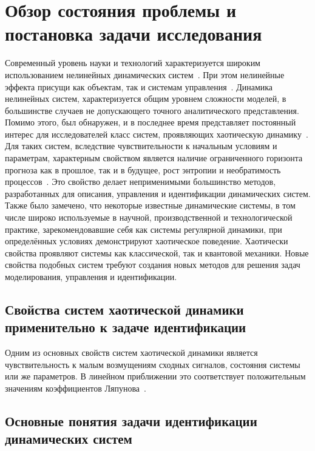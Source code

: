 \chapter{Обзор состояния проблемы и постановка задачи исследования}

Современный уровень науки и технологий характеризуется
широким использованием нелинейных динамических
систем~\cite{andronov_vitt_haikin,anisch_nonlin_eff,mishenko_du_small_relax,nonlin_vibro}.
При этом нелинейные эффекта присущи как объектам,
так и системам управления~\cite{kubik_nlsc,vukobr_nonadopt}. Динамика нелинейных систем,
характеризуется общим уровнем сложности моделей,
в большинстве случаев не допускающего
точного аналитического представления.
Помимо этого, был обнаружен, и в последнее время представляет
постоянный интерес для исследователей класс систем,
проявляющих хаотическую динамику~\cite{moon_chaotic_vibr,magni_theory_dyn_chaos,kuznetsov_dyn_chaos,neimark_stoch_chaos_vibro}.
Для таких систем, вследствие чувствительности к начальным условиям
и параметрам, характерным свойством является наличие ограниченного горизонта прогноза как
в прошлое, так и в будущее, рост энтропии
и необратимость процессов~\cite{chernavskii_syn_info,prigogine_from_existent,koltsova_nl_dyn_chem}.
Это свойство делает неприменимыми
большинство методов, разработанных для описания, управления и
идентификации динамических систем. Также было замечено,
что некоторые известные динамические системы, в том числе широко
используемые в научной, производственной и технологической практике,
зарекомендовавшие себя как системы регулярной динамики,
при определённых условиях демонстрируют хаотическое поведение.
Хаотически свойства проявляют системы как классической,
так и квантовой механики.
Новые свойства подобных систем требуют создания новых
методов для решения задач моделирования, управления и идентификации.

\section{Свойства систем хаотической динамики применительно к задаче идентификации}  %

Одним из основных свойств систем хаотической динамики является чувствительность
к малым возмущениям сходных сигналов, состояния системы или же параметров.
В линейном приближении это соответствует положительным значениям
коэффициентов Ляпунова~\cite{magni_theory_dyn_chaos,moon_chaotic_vibr}.



\section{Основные понятия задачи идентификации динамических систем} %

